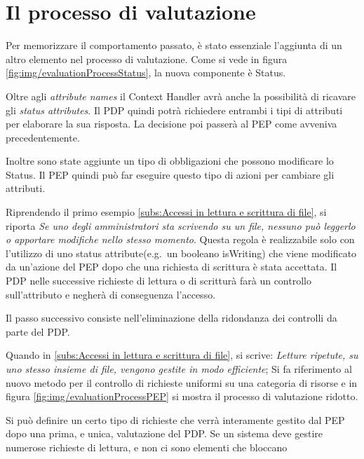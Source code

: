 \section{Il processo di valutazione}
\label{sec:Il processo di valutazione}
Per memorizzare il comportamento passato, è stato essenziale l'aggiunta di un altro elemento nel processo di valutazione.
Come si vede in figura \ref{fig:img/evaluationProcessStatus}, la nuova componente è Status.\par
{}
Oltre agli \emph{attribute names} il Context Handler avrà anche la possibilità di ricavare gli \emph{status attributes}.
Il PDP quindi potrà richiedere entrambi i tipi di attributi per elaborare la sua risposta. La decisione poi passerà al PEP
come avveniva precedentemente.\par
Inoltre sono state aggiunte un tipo di obbligazioni che possono modificare lo Status. Il PEP quindi può far eseguire questo tipo di
azioni per cambiare gli attributi.\\\par
Riprendendo il primo esempio \ref{subs:Accessi in lettura e scrittura di file}, si riporta \emph{Se uno degli amministratori
sta scrivendo su un file, nessuno può leggerlo o apportare modifiche nello stesso momento}. Questa regola è realizzabile
solo con l'utilizzo di uno status attribute(e.g.\ un booleano isWriting) che viene modificato da un'azione del PEP dopo che
una richiesta di scrittura è stata accettata. Il PDP nelle successive richieste di lettura o di scritturà farà un controllo
sull'attributo e negherà di conseguenza l'accesso.\\\par
{}
Il passo successivo consiste nell'eliminazione della ridondanza dei controlli da parte del PDP.\par
Quando in \ref{subs:Accessi in lettura e scrittura di file}, si scrive:
\emph{Letture ripetute, su uno stesso insieme di file, vengono gestite in modo efficiente};
Si fa riferimento al nuovo metodo per il controllo di richieste uniformi su una categoria di risorse e
in figura \ref{fig:img/evaluationProcessPEP} si mostra il processo di valutazione ridotto.\\\par
Si può definire un certo tipo di richieste che verrà interamente gestito dal PEP dopo una prima, e unica,
valutazione del PDP. Se un sistema deve gestire numerose richieste di lettura, e non ci sono elementi che bloccano
